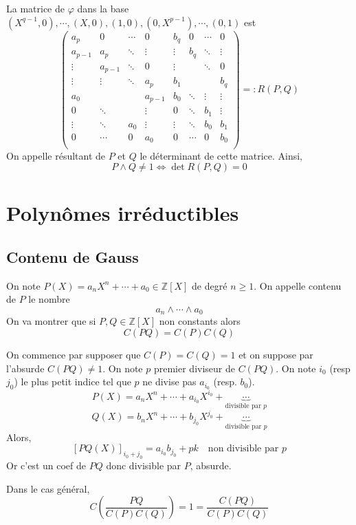 \documentclass{article}
\theoremstyle{definition}
\begin{document}
La matrice de $\varphi$ dans la base $(X^{q-1}, 0), \cdots, (X, 0), (1, 0), (0, X^{p-1}), \cdots, (0, 1)$ est \[
\begin{pmatrix}a_{p}&0&\cdots &0&b_{q}&0&\cdots &0\\a_{p-1}&a_{p}&\ddots &\vdots &\vdots &b_{q}&\ddots &\vdots \\\vdots &a_{p-1}&\ddots &0&\vdots &&\ddots &0\\\vdots &\vdots &\ddots &a_{p}&b_{1}&&&b_{q}\\a_{0}&&&a_{p-1}&b_{0}&\ddots &\vdots &\vdots \\0&\ddots &&\vdots &0&\ddots &b_{1}&\vdots \\\vdots &\ddots &a_{0}&\vdots &\vdots &\ddots &b_{0}&b_{1}\\0&\cdots &0&a_{0}&0&\cdots &0&b_{0}\\\end{pmatrix}=:R(P, Q)
\]
On appelle résultant de $P$ et $Q$ le déterminant de cette matrice. Ainsi, \[
    P\land Q\neq 1 \iff \det R(P, Q)=0
\]

\section{Polynômes irréductibles}

\subsection{Contenu de Gauss}

On note $P(X)=a_nX^n+\cdots + a_0\in\mathbb Z[X]$ de degré $n\geq 1$. On appelle contenu de $P$ le nombre \[
    a_n\land\cdots\land a_0
\]
On va montrer que si $P, Q\in\mathbb Z[X]$ non constants alors \[
    C(PQ)=C(P)C(Q)
\]

On commence par supposer que $C(P)=C(Q)=1$ et on suppose par l'absurde $C(PQ)\neq 1$. On note $p$ premier diviseur de $C(PQ)$. On note $i_0$ (resp $j_0$) le plus petit indice tel que $p$ ne divise pas $a_{i_0}$ (resp. $b_0$). \[
    P(X)=a_nX^n+\cdots +a_{i_0}X^{i_0}+\underbrace{\cdots}_{\text{divisible par } p} \]\[
    Q(X)=b_nX^n+\cdots +b_{j_0}X^{j_0}+\underbrace{\cdots}_{\text{divisible par } p}
\]
Alors, \[
    [PQ(X)]_{i_0+j_0}=a_{i_0}b_{j_0}+pk \quad \text{non divisible par $p$}
\]
Or c'est un coef de $PQ$ donc divisible par $P$, absurde.

Dans le cas général, \[
    C\left(\frac{PQ}{C(P)C(Q)}\right)=1=\frac{C(PQ)}{C(P)C(Q)}
\]
\end{document}
